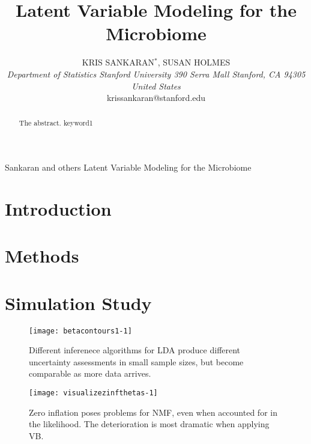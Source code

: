 \documentclass[oupdraft]{bio}
\begin{document}
\title{Latent Variable Modeling for the Microbiome} 

\author{
  KRIS SANKARAN$^\ast$, SUSAN HOLMES\\[4pt]
  \textit{
    Department of Statistics
    Stanford University
    390 Serra Mall
    Stanford, CA 94305
    United States
  } \\[2pt]
  {krissankaran@stanford.edu}
}

\markboth
{Sankaran and others}
{Latent Variable Modeling for the Microbiome}

\maketitle


\begin{abstract}
  {
    The abstract.
  }
  {
    keyword1
  }
\end{abstract}

\section{Introduction}

\section{Methods}

\section{Simulation Study}

\begin{figure}
\texttt{[image: betacontours1-1]}
\caption{Different inferenece algorithms for LDA produce different uncertainty
  assessments in small sample sizes, but become comparable as more data arrives.}
\label{fig:lda_contours}
\end{figure}

\begin{figure}
\texttt{[image: visualizezinfthetas-1]}
\caption{Zero inflation poses problems for NMF, even when accounted for in the likelihood. The deterioration is most dramatic when applying VB.}
\end{figure}
\end{document}
